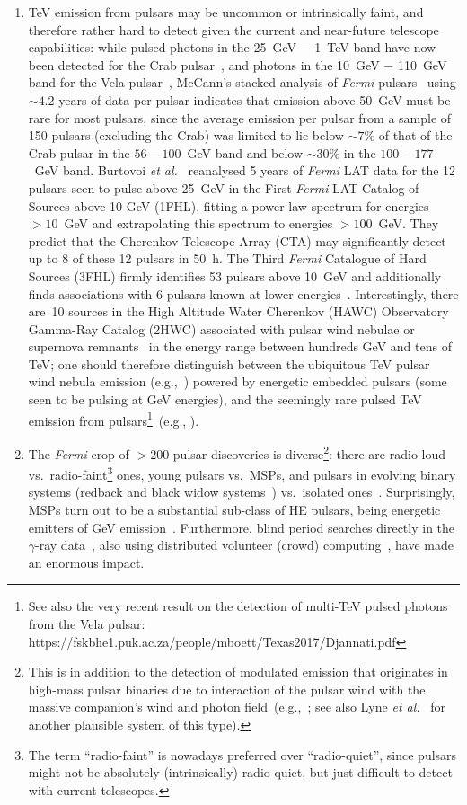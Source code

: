 \documentclass{PoS}
\begin{document}
\begin{enumerate}
  \item TeV emission from pulsars may be uncommon or intrinsically faint, and therefore rather hard to detect given the current and near-future telescope capabilities: while pulsed photons in the 25~GeV $-$ 1~TeV band have now been detected for the Crab pulsar~\cite{MAGIC_Crab08,MAGIC_Crab11,MAGIC_Crab12,Ansoldi16}, and photons in the 10~GeV $-$ 110~GeV band for the Vela pulsar~\cite{Leung14,DeNaurois15}, McCann's stacked analysis of \textit{Fermi} pulsars~\cite{McCann15} using $\sim4.2$ years of data per pulsar indicates that emission above 50~GeV must be rare for most pulsars, since the average emission per pulsar from a sample of 150 pulsars (excluding the Crab) was limited to lie below $\sim7\%$ of that of the Crab pulsar in the $56-100$~GeV band and below $\sim30\%$ in the $100-177$~GeV band. Burtovoi \textit{et al.}~\cite{Burtovoi17} reanalysed 5 years of \textit{Fermi} LAT data for the 12 pulsars seen to pulse above 25~GeV in the First \textit{Fermi} LAT Catalog of Sources above 10 GeV (1FHL), fitting a power-law spectrum for energies $>10$~GeV and extrapolating this spectrum to energies $>100$~GeV. They predict that the Cherenkov Telescope Array (CTA) may significantly detect up to 8 of these 12 pulsars in 50~h. The Third \textit{Fermi} Catalogue of Hard Sources (3FHL) firmly identifies 53 pulsars above 10~GeV and additionally finds  associations with 6 pulsars known at lower energies~\cite{3FHL}. Interestingly, there are~10 sources in the High Altitude Water Cherenkov (HAWC) Observatory Gamma-Ray Catalog (2HWC) associated with pulsar wind nebulae or supernova remnants~\cite{2HWC} in the energy range between hundreds GeV and tens of TeV; one should therefore distinguish between the ubiquitous TeV pulsar wind nebula emission (e.g.,~\cite{HESS_PWN17}) powered by energetic embedded pulsars (some seen to be pulsing at GeV energies), and the seemingly rare pulsed TeV emission from pulsars\footnote{See also the very recent result on the detection of multi-TeV pulsed photons from the Vela pulsar: https://fskbhe1.puk.ac.za/people/mboett/Texas2017/Djannati.pdf}~(e.g., \cite{Ansoldi16,DeNaurois15}).
  \item The \textit{Fermi} crop of $>200$ pulsar discoveries is diverse\footnote{This is in addition to the detection of modulated emission that originates in high-mass pulsar binaries due to interaction of the pulsar wind with the massive companion's wind and photon field~(e.g.,~\cite{B1259,Xing16}; see also Lyne \textit{et al.}~\cite{Lyne15} for another plausible system of this type).}: there are radio-loud vs.\ radio-faint\footnote{The term ``radio-faint'' is nowadays preferred over ``radio-quiet'', since pulsars might not be absolutely (intrinsically) radio-quiet, but just difficult to detect with current telescopes.} ones, young pulsars vs.\ MSPs, and pulsars in evolving binary systems (redback and black widow systems~\cite{Roberts11}) vs.\ isolated ones~\cite{Smith17}. Surprisingly, MSPs turn out to be a substantial sub-class of HE pulsars, being energetic emitters of GeV emission~\cite{Caraveo14,Grenier15}. Furthermore, blind period searches directly in the $\gamma$-ray data~\cite{SazParkinson2010,Pletsch12}, also using distributed volunteer (crowd) computing~\cite{Clark17}, have made an enormous impact.

\end{enumerate}
\end{document}
